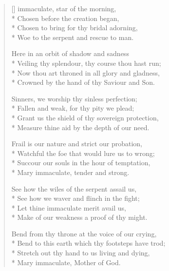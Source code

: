 \newHymn
{}

\begin{verse}[\versewidth]
 immaculate, star of the morning,\\*
Chosen before the creation began,\\*
Chosen to bring for thy bridal adorning,\\*
Woe to the serpent and rescue to man.

 Here in an orbit of shadow and sadness\\*
Veiling thy splendour, thy course thou hast run;\\*
Now thou art throned in all glory and gladness,\\*
Crowned by the hand of thy Saviour and Son.

 Sinners, we worship thy sinless perfection;\\*
Fallen and weak, for thy pity we plead;\\*
Grant us the shield of thy sovereign protection,\\*
Measure thine aid by the depth of our need.

 Frail is our nature and strict our probation,\\*
Watchful the foe that would lure us to wrong;\\*
Succour our souls in the hour of temptation,\\*
Mary immaculate, tender and strong.

 See how the wiles of the serpent assail us,\\*
See how we waver and flinch in the fight;\\*
Let thine immaculate merit avail us,\\*
Make of our weakness a proof of thy might.

 Bend from thy throne at the voice of our crying,\\*
Bend to this earth which thy footsteps have trod;\\*
Stretch out thy hand to us living and dying,\\*
Mary immaculate, Mother of God.

\end{verse}





